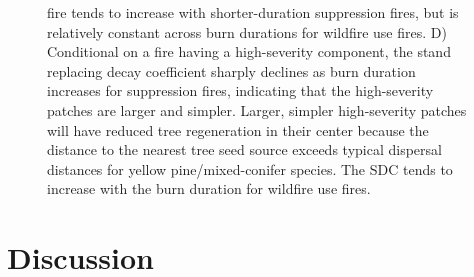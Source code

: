 \documentclass[twoside,12pt,final]{ucthesis-CA2012}
\begin{document}
\begin{ucmainmatter}
\begin{figure}
{fire tends to increase with shorter-duration suppression fires, but is
relatively constant across burn durations for wildfire use fires. D)
Conditional on a fire having a high-severity component, the stand
replacing decay coefficient sharply declines as burn duration increases
for suppression fires, indicating that the high-severity patches are
larger and simpler. Larger, simpler high-severity patches will have
reduced tree regeneration in their center because the distance to the
nearest tree seed source exceeds typical dispersal distances for yellow
pine/mixed-conifer species. The SDC tends to increase with the burn
duration for wildfire use fires.}
\end{figure}
\section{Discussion}\label{discussion-2}


\end{ucmainmatter}
\end{document}
